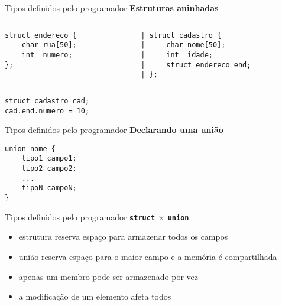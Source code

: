\documentclass[10pt]{beamer}
\begin{document}
\begin{frame}[fragile]{Tipos definidos pelo programador}
    \huge
    \textbf{Estruturas aninhadas}

    \large
    \begin{columns}
    \begin{column}{0.35\textwidth}
        \begin{verbatim}
struct endereco {
    char rua[50];
    int  numero;
};

        \end{verbatim}
    \end{column}
    \begin{column}{0.55\textwidth}
        \begin{verbatim}
| struct cadastro {
|     char nome[50];
|     int  idade;
|     struct endereco end;
| };
        \end{verbatim}
    \end{column}
    \end{columns}

    \begin{verbatim}
struct cadastro cad;
cad.end.numero = 10;
    \end{verbatim}

\end{frame}

\begin{frame}[fragile]{Tipos definidos pelo programador}
    \huge
    \textbf{Declarando uma união}

    \Large
    \begin{verbatim}
union nome {
    tipo1 campo1;
    tipo2 campo2;
    ...
    tipoN campoN;
}
    \end{verbatim}
\end{frame}

\begin{frame}[fragile]{Tipos definidos pelo programador}
    \huge
    \textbf{\texttt{struct} $\times$ \texttt{union}}

    \vfill

    \large
    \setlength{\leftmargini}{0pt}
    \begin{itemize}
        \item [] estrutura reserva espaço para armazenar todos os campos
        \item [] união reserva espaço para o maior campo e a memória é compartilhada
        \item [] apenas um membro pode ser armazenado por vez
        \item [] a modificação de um elemento afeta todos
    \end{itemize}

\end{frame}
\end{document}
